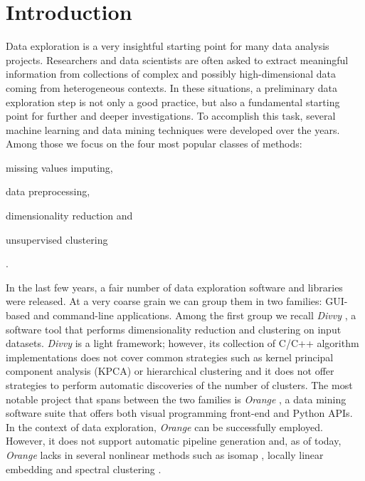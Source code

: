 \documentclass[twoside,11pt]{article}
\makeatletter
\newcommand{\py}{{Python}\@\xspace}
\makeatother
\begin{document}
\section{Introduction}\label{sec:intro}
Data exploration is a very insightful starting point for many data analysis projects. Researchers and data scientists are often asked to extract meaningful information from collections of complex and possibly high-dimensional data coming from heterogeneous contexts.
In these situations, a preliminary data exploration step is not only a good practice, but also a fundamental starting point for further and deeper investigations.
To accomplish this task, several machine learning and data mining techniques were developed over the years.
Among those we focus on the four most popular classes of methods: \begin{enumerate*}[label=(\roman*)]
  \item missing values imputing,
  \item data preprocessing,
  \item dimensionality reduction and
  \item unsupervised clustering
\end{enumerate*}.

In the last few years, a fair number of data exploration software and libraries were released. At a very coarse grain we can group them in two families: GUI-based and command-line applications.
Among the first group we recall \emph{Divvy} \citep{lewis2013divvy}, a software tool that performs dimensionality reduction and clustering on input datasets. \emph{Divvy} is a light framework; however,
its collection of {C/C++} algorithm implementations does not cover common strategies such as kernel principal component analysis (KPCA) \citep{scholkopf1997kernel} or hierarchical clustering \citep{friedman2001elements} and it does not offer strategies to perform automatic discoveries of the number of clusters.
The most notable project that spans between the two families is \emph{Orange} \citep{demvsar2013orange}, a data mining software suite that offers both visual programming front-end and \py APIs. In the context of data exploration, \emph{Orange} can be successfully employed. However, it does not support automatic pipeline generation
and, as of today, \emph{Orange} lacks in several nonlinear methods such as isomap \citep{tenenbaum2000global}, locally linear embedding \citep{roweis2000nonlinear} and spectral clustering \citep{shi2000normalized}.
\end{document}
